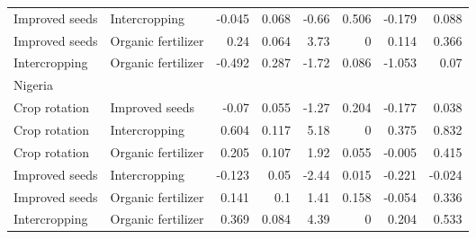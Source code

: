 \documentclass[
]{article}
\begin{document}
\begin{table}[]
{\begin{tabular}{llrrrrrr}
Improved seeds & Intercropping      & -0.045                          & 0.068                                & -0.66                 & 0.506                                & -0.179                & 0.088                 \\
Improved seeds & Organic fertilizer & 0.24                            & 0.064                                & 3.73                  & 0                                    & 0.114                 & 0.366                 \\
Intercropping  & Organic fertilizer & -0.492                          & 0.287                                & -1.72                 & 0.086                                & -1.053                & 0.07                  \\ \hline
\multicolumn{8}{l}{\cellcolor[HTML]{DBE8FF}Nigeria}                                                                                                                                                                         \\ \hline
Crop rotation  & Improved seeds     & -0.07                           & 0.055                                & -1.27                 & 0.204                                & -0.177                & 0.038                 \\
Crop rotation  & Intercropping      & 0.604                           & 0.117                                & 5.18                  & 0                                    & 0.375                 & 0.832                 \\
Crop rotation  & Organic fertilizer & 0.205                           & 0.107                                & 1.92                  & 0.055                                & -0.005                & 0.415                 \\
Improved seeds & Intercropping      & -0.123                          & 0.05                                 & -2.44                 & 0.015                                & -0.221                & -0.024                \\
Improved seeds & Organic fertilizer & 0.141                           & 0.1                                  & 1.41                  & 0.158                                & -0.054                & 0.336                 \\
Intercropping  & Organic fertilizer & 0.369                           & 0.084                                & 4.39                  & 0                                    & 0.204                 & 0.533                 \\ \hline
\end{tabular}%
}
\end{table}
\end{document}
